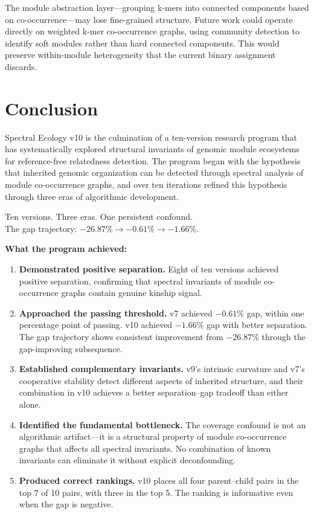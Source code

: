 \documentclass{../yalumba}
\begin{document}
The module abstraction layer---grouping k-mers into connected components
based on co-occurrence---may lose fine-grained structure.  Future work
could operate directly on weighted k-mer co-occurrence graphs, using
community detection to identify soft modules rather than hard
connected components.  This would preserve within-module heterogeneity
that the current binary assignment discards.


\section{Conclusion}
\label{sec:conclusion}

Spectral Ecology v10 is the culmination of a ten-version research
program that has systematically explored structural invariants of
genomic module ecosystems for reference-free relatedness detection.
The program began with the hypothesis that inherited genomic
organization can be detected through spectral analysis of module
co-occurrence graphs, and over ten iterations refined this hypothesis
through three eras of algorithmic development.

\begin{pullquote}
Ten versions.  Three eras.  One persistent confound.\\
The gap trajectory: $-26.87\% \to -0.61\% \to -1.66\%$.
\end{pullquote}

\textbf{What the program achieved:}

\begin{enumerate}
\item \textbf{Demonstrated positive separation.}  Eight of ten versions
  achieved positive separation, confirming that spectral invariants of
  module co-occurrence graphs contain genuine kinship signal.

\item \textbf{Approached the passing threshold.}  v7 achieved $-0.61\%$
  gap, within one percentage point of passing.  v10 achieved $-1.66\%$
  gap with better separation.  The gap trajectory shows consistent
  improvement from $-26.87\%$ through the gap-improving subsequence.

\item \textbf{Established complementary invariants.}  v9's intrinsic
  curvature and v7's cooperative stability detect different aspects of
  inherited structure, and their combination in v10 achieves a better
  separation--gap tradeoff than either alone.

\item \textbf{Identified the fundamental bottleneck.}  The coverage
  confound is not an algorithmic artifact---it is a structural property
  of module co-occurrence graphs that affects all spectral invariants.
  No combination of known invariants can eliminate it without explicit
  deconfounding.

\item \textbf{Produced correct rankings.}  v10 places all four
  parent--child pairs in the top 7 of 10 pairs, with three in the top 5.
  The ranking is informative even when the gap is negative.
\end{enumerate}
\end{document}
